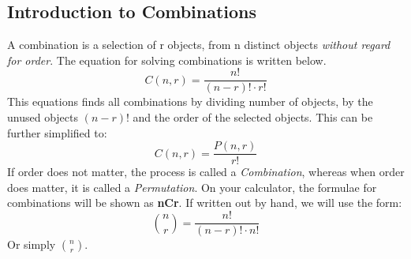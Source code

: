     \subsection{Introduction to Combinations}
    A combination is a selection of r objects, from n distinct objects \emph{without regard for order}.
    The equation for solving combinations is written below.
    \begin{equation*}
        C(n,r) = \frac{n!}{(n-r)!\cdot r!}
    \end{equation*}
    This equations finds all combinations by dividing number of objects, by the unused objects $(n-r)!$ and the order of the selected objects.
    This can be further simplified to:
    \begin{equation*}
        C(n,r) = \frac{P(n,r)}{r!}
    \end{equation*}
    If order does not matter, the process is called a \emph{Combination}, whereas when order does matter, it is called a \emph{Permutation}.
    On your calculator, the formulae for combinations will be shown as \textbf{nCr}.
    If written out by hand, we will use the form:
    \begin{equation*}
        \binom{n}{r} = \frac{n!}{(n-r)!\cdot n!}
    \end{equation*}
    Or simply \(\binom{n}{r}\).
    
